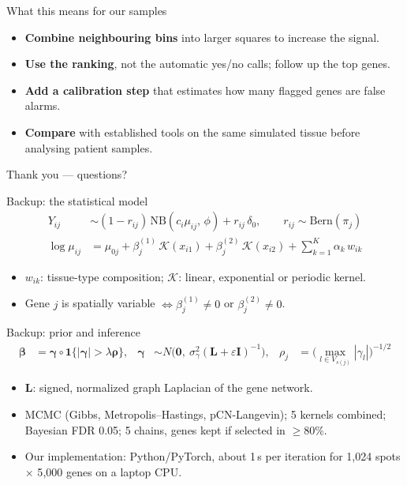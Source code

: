 \documentclass[10pt,aspectratio=169]{beamer}
\begin{document}
\begin{frame}{What this means for our samples}
  \begin{itemize}
    \item \textbf{Combine neighbouring bins} into larger squares to increase the signal.
    \item \textbf{Use the ranking}, not the automatic yes/no calls; follow up the top genes.
    \item \textbf{Add a calibration step} that estimates how many flagged genes are false alarms.
    \item \textbf{Compare} with established tools on the same simulated tissue before analysing patient samples.
  \end{itemize}
\end{frame}

\begin{frame}
  \centering \Large Thank you --- questions?
\end{frame}

\appendix

\begin{frame}{Backup: the statistical model}
  \begin{align*}
    Y_{ij} &\sim (1-r_{ij})\,\mathrm{NB}(c_i\mu_{ij},\,\phi) + r_{ij}\,\delta_0,
           \qquad r_{ij}\sim\mathrm{Bern}(\pi_j)\\[2mm]
    \log\mu_{ij} &= \mu_{0j} + \beta^{(1)}_j\,\mathcal K(x_{i1}) + \beta^{(2)}_j\,\mathcal K(x_{i2})
           + \textstyle\sum_{k=1}^{K}\alpha_k\,w_{ik}
  \end{align*}
  \begin{itemize}
    \item $w_{ik}$: tissue-type composition; $\mathcal K$: linear, exponential or periodic kernel.
    \item Gene $j$ is spatially variable $\iff \beta^{(1)}_j\neq0$ or $\beta^{(2)}_j\neq0$.
  \end{itemize}
\end{frame}

\begin{frame}{Backup: prior and inference}
  \begin{align*}
    \boldsymbol\beta &= \boldsymbol\gamma\circ\mathbf 1\{|\boldsymbol\gamma|>\lambda\boldsymbol\rho\},
    &\boldsymbol\gamma &\sim N\big(\mathbf 0,\ \sigma^2_\gamma(\mathbf L+\varepsilon\mathbf I)^{-1}\big),
    &\rho_j &= \Big(\max_{l\in V_{s(j)}}|\gamma_l|\Big)^{-1/2}
  \end{align*}
  \small
  \begin{itemize}
    \item $\mathbf L$: signed, normalized graph Laplacian of the gene network.
    \item MCMC (Gibbs, Metropolis--Hastings, pCN-Langevin); 5 kernels combined; Bayesian FDR 0.05;
          5 chains, genes kept if selected in $\geq80\%$.
    \item Our implementation: Python/PyTorch, about 1\,s per iteration for 1{,}024 spots $\times$ 5{,}000 genes on a laptop CPU.
  \end{itemize}
\end{frame}
\end{document}
